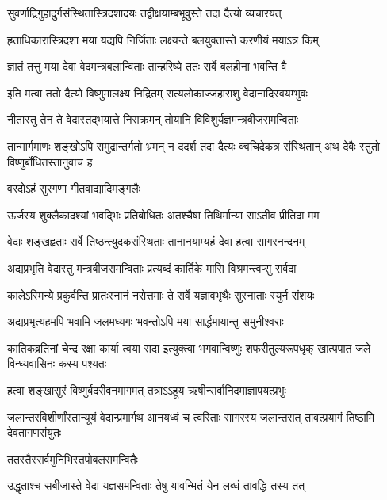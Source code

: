 \twolineshloka
{सुवर्णाद्रिगुहादुर्गसंस्थितास्त्रिदशादयः}
{तद्वीक्षयाम्बभूवुस्ते तदा दैत्यो व्यचारयत्} %

\twolineshloka
{हृताधिकारास्त्रिदशा मया यद्यपि निर्जिताः}
{लक्ष्यन्ते बलयुक्तास्ते करणीयं मयाऽत्र किम्} %

\twolineshloka
{ज्ञातं तत्तु मया देवा वेदमन्त्रबलान्विताः}
{तान्हरिष्ये ततः सर्वे बलहीना भवन्ति वै} %

\twolineshloka
{इति मत्वा ततो दैत्यो विष्णुमालक्ष्य निद्रितम्}
{सत्यलोकाज्जहाराशु वेदानादिस्वयम्भुवः} %

\twolineshloka
{नीतास्तु तेन ते वेदास्तद्भयात्ते निराक्रमन्}
{तोयानि विविशुर्यज्ञमन्त्रबीजसमन्विताः} %

\threelineshloka
{तान्मार्गमाणः शङ्खोऽपि समुद्रान्तर्गतो भ्रमन्}
{न ददर्श तदा दैत्यः क्वचिदेकत्र संस्थितान्}
{अथ देवैः स्तुतो विष्णुर्बोधितस्तानुवाच ह} %



\onelineshloka
{वरदोऽहं सुरगणा गीतवाद्यादिमङ्गलैः} %

\twolineshloka
{ऊर्जस्य शुक्लैकादश्यां भवद्भिः प्रतिबोधितः}
{अतश्चैषा तिथिर्मान्या साऽतीव प्रीतिदा मम} %

\twolineshloka
{वेदाः शङ्खहृताः सर्वे तिष्ठन्त्युदकसंस्थिताः}
{तानानयाम्यहं देवा हत्वा सागरनन्दनम्} %

\twolineshloka
{अद्यप्रभृति वेदास्तु मन्त्रबीजसमन्विताः}
{प्रत्यब्दं कार्तिके मासि विश्रमन्त्वप्सु सर्वदा} %

\twolineshloka
{कालेऽस्मिन्ये प्रकुर्वन्ति प्रातःस्नानं नरोत्तमाः}
{ते सर्वे यज्ञावभृथैः सुस्नाताः स्युर्न संशयः} %

\twolineshloka
{अद्यप्रभृत्यहमपि भवामि जलमध्यगः}
{भवन्तोऽपि मया सार्द्धमायान्तु समुनीश्वराः} %

\threelineshloka
{कातिकव्रतिनां चेन्द्र रक्षा कार्या त्वया सदा}
{इत्युक्त्वा भगवान्विष्णुः शफरीतुल्यरूपधृक्}
{खात्पपात जले विन्ध्यवासिनः कस्य पश्यतः} %

\twolineshloka
{हत्वा शङ्खासुरं विष्णुर्बदरीवनमागमत्}
{तत्राऽऽहूय ऋषीन्सर्वानिदमाज्ञापयत्प्रभुः} %


\threelineshloka
{जलान्तरविशीर्णांस्तान्यूयं वेदान्प्रमार्गथ}
{आनयध्वं च त्वरिताः सागरस्य जलान्तरात्}
{तावत्प्रयागं तिष्ठामि देवतागणसंयुतः} %



\onelineshloka
{ततस्तैस्सर्वमुनिभिस्तपोबलसमन्वितैः} %

\twolineshloka
{उद्धृताश्च सबीजास्ते वेदा यज्ञसमन्विताः}
{तेषु यावन्मितं येन लब्धं तावद्धि तस्य तत्} %

